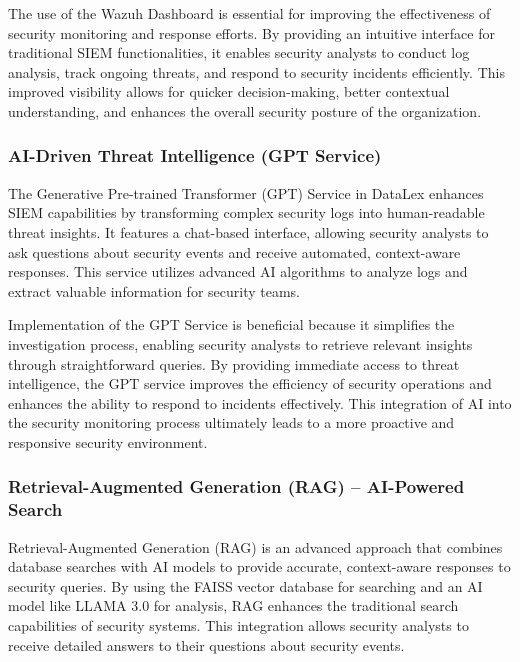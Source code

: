 The use of the Wazuh Dashboard is essential for improving the effectiveness of security monitoring and response efforts. By providing an intuitive interface for traditional SIEM functionalities, it enables security analysts to conduct log analysis, track ongoing threats, and respond to security incidents efficiently. This improved visibility allows for quicker decision-making, better contextual understanding, and enhances the overall security posture of the organization.

\subsubsection{AI-Driven Threat Intelligence (GPT Service)}
\label{subsubsec_gpt_service}

The Generative Pre-trained Transformer (GPT) Service in DataLex enhances SIEM capabilities by transforming complex security logs into human-readable threat insights. It features a chat-based interface, allowing security analysts to ask questions about security events and receive automated, context-aware responses. This service utilizes advanced AI algorithms to analyze logs and extract valuable information for security teams.

Implementation of the GPT Service is beneficial because it simplifies the investigation process, enabling security analysts to retrieve relevant insights through straightforward queries. By providing immediate access to threat intelligence, the GPT service improves the efficiency of security operations and enhances the ability to respond to incidents effectively. This integration of AI into the security monitoring process ultimately leads to a more proactive and responsive security environment.

\subsubsection{Retrieval-Augmented Generation (RAG) -- AI-Powered Search}
\label{subsubsec_rag}

Retrieval-Augmented Generation (RAG) is an advanced approach that combines database searches with AI models to provide accurate, context-aware responses to security queries. By using the FAISS vector database for searching and an AI model like LLAMA 3.0 for analysis, RAG enhances the traditional search capabilities of security systems. This integration allows security analysts to receive detailed answers to their questions about security events.

